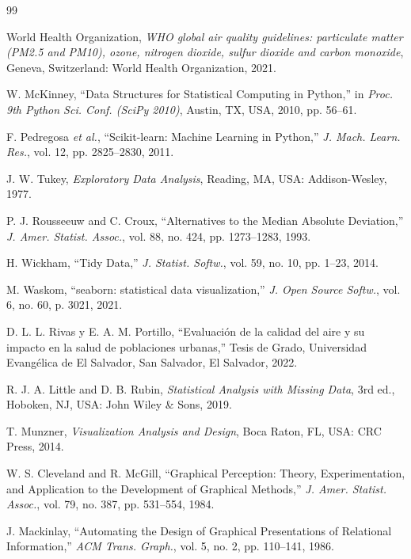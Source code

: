 \documentclass[journal,twocolumn,spanish]{IEEEtran}
\begin{document}
\begin{thebibliography}{99}

World Health Organization, \emph{WHO global air quality guidelines: particulate matter (PM2.5 and PM10), ozone, nitrogen dioxide, sulfur dioxide and carbon monoxide}, Geneva, Switzerland: World Health Organization, 2021.

W. McKinney, ``Data Structures for Statistical Computing in Python,'' in \emph{Proc. 9th Python Sci. Conf. (SciPy 2010)}, Austin, TX, USA, 2010, pp. 56--61.

F. Pedregosa \emph{et al.}, ``Scikit-learn: Machine Learning in Python,'' \emph{J. Mach. Learn. Res.}, vol. 12, pp. 2825--2830, 2011.

J. W. Tukey, \emph{Exploratory Data Analysis}, Reading, MA, USA: Addison-Wesley, 1977.

P. J. Rousseeuw and C. Croux, ``Alternatives to the Median Absolute Deviation,'' \emph{J. Amer. Statist. Assoc.}, vol. 88, no. 424, pp. 1273--1283, 1993.

H. Wickham, ``Tidy Data,'' \emph{J. Statist. Softw.}, vol. 59, no. 10, pp. 1--23, 2014.

M. Waskom, ``seaborn: statistical data visualization,'' \emph{J. Open Source Softw.}, vol. 6, no. 60, p. 3021, 2021.

D. L. L. Rivas y E. A. M. Portillo, ``Evaluación de la calidad del aire y su impacto en la salud de poblaciones urbanas,'' Tesis de Grado, Universidad Evangélica de El Salvador, San Salvador, El Salvador, 2022.

R. J. A. Little and D. B. Rubin, \emph{Statistical Analysis with Missing Data}, 3rd ed., Hoboken, NJ, USA: John Wiley \& Sons, 2019.

T. Munzner, \emph{Visualization Analysis and Design}, Boca Raton, FL, USA: CRC Press, 2014.

W. S. Cleveland and R. McGill, ``Graphical Perception: Theory, Experimentation, and Application to the Development of Graphical Methods,'' \emph{J. Amer. Statist. Assoc.}, vol. 79, no. 387, pp. 531--554, 1984.

J. Mackinlay, ``Automating the Design of Graphical Presentations of Relational Information,'' \emph{ACM Trans. Graph.}, vol. 5, no. 2, pp. 110--141, 1986.


\end{thebibliography}
\end{document}
